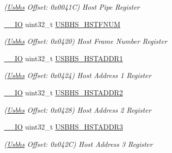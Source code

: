 \begin{DoxyCompactItemize}
\begin{DoxyCompactList}\small\item\em (\mbox{\hyperlink{structUsbhs}{Usbhs}} Offset\+: 0x0041C) Host Pipe Register \end{DoxyCompactList}\item 
\mbox{\label{structUsbhs_aacdac73a732627329540de0fa9df3e66}} 
\mbox{\hyperlink{core__cm7_8h_aec43007d9998a0a0e01faede4133d6be}{\+\_\+\+\_\+\+IO}} uint32\+\_\+t \mbox{\hyperlink{structUsbhs_aacdac73a732627329540de0fa9df3e66}{U\+S\+B\+H\+S\+\_\+\+H\+S\+T\+F\+N\+UM}}
\begin{DoxyCompactList}\small\item\em (\mbox{\hyperlink{structUsbhs}{Usbhs}} Offset\+: 0x0420) Host Frame Number Register \end{DoxyCompactList}\item 
\mbox{\label{structUsbhs_a37ff7a729c552fb5dc207344df62c13d}} 
\mbox{\hyperlink{core__cm7_8h_aec43007d9998a0a0e01faede4133d6be}{\+\_\+\+\_\+\+IO}} uint32\+\_\+t \mbox{\hyperlink{structUsbhs_a37ff7a729c552fb5dc207344df62c13d}{U\+S\+B\+H\+S\+\_\+\+H\+S\+T\+A\+D\+D\+R1}}
\begin{DoxyCompactList}\small\item\em (\mbox{\hyperlink{structUsbhs}{Usbhs}} Offset\+: 0x0424) Host Address 1 Register \end{DoxyCompactList}\item 
\mbox{\label{structUsbhs_ae0eb265e925b828676b11bee09044745}} 
\mbox{\hyperlink{core__cm7_8h_aec43007d9998a0a0e01faede4133d6be}{\+\_\+\+\_\+\+IO}} uint32\+\_\+t \mbox{\hyperlink{structUsbhs_ae0eb265e925b828676b11bee09044745}{U\+S\+B\+H\+S\+\_\+\+H\+S\+T\+A\+D\+D\+R2}}
\begin{DoxyCompactList}\small\item\em (\mbox{\hyperlink{structUsbhs}{Usbhs}} Offset\+: 0x0428) Host Address 2 Register \end{DoxyCompactList}\item 
\mbox{\label{structUsbhs_aba408ebe7233452cd800d0f43f783ba1}} 
\mbox{\hyperlink{core__cm7_8h_aec43007d9998a0a0e01faede4133d6be}{\+\_\+\+\_\+\+IO}} uint32\+\_\+t \mbox{\hyperlink{structUsbhs_aba408ebe7233452cd800d0f43f783ba1}{U\+S\+B\+H\+S\+\_\+\+H\+S\+T\+A\+D\+D\+R3}}
\begin{DoxyCompactList}\small\item\em (\mbox{\hyperlink{structUsbhs}{Usbhs}} Offset\+: 0x042C) Host Address 3 Register \end{DoxyCompactList}\item 

\end{DoxyCompactItemize}
